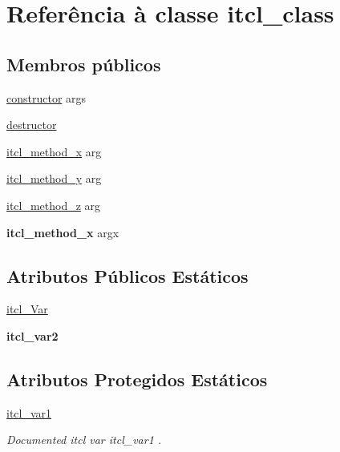 \hypertarget{classns_1_1itcl__class}{\section{Referência à classe itcl\-\_\-class}
\label{classns_1_1itcl__class}
}
\subsection*{Membros públicos}
\begin{DoxyCompactItemize}
\item 
\hyperlink{classns_1_1itcl__class_a774a51943bf6609f7582ee38c55a13f0}{constructor} args
\item 
\hyperlink{classns_1_1itcl__class_aa04747d49a3a74e75fcfdaf017a73877}{destructor}
\item 
\hyperlink{classns_1_1itcl__class_ac6935d07ea2c4734cdc930c839ee8c8b}{itcl\-\_\-method\-\_\-x} arg
\item 
\hyperlink{classns_1_1itcl__class_aebc048061815775e39d37da80986eaad}{itcl\-\_\-method\-\_\-y} arg
\item 
\hyperlink{classns_1_1itcl__class_a173dffcfe26dd79837a07bbdcf68b0ca}{itcl\-\_\-method\-\_\-z} arg
\item 
\hypertarget{classns_1_1itcl__class_af59b0413efa3edddf396f90765a7dbb0}{{\bfseries itcl\-\_\-method\-\_\-x} argx}\label{classns_1_1itcl__class_af59b0413efa3edddf396f90765a7dbb0}

\end{DoxyCompactItemize}
\subsection*{Atributos Públicos Estáticos}
\begin{DoxyCompactItemize}
\item 
\hyperlink{classns_1_1itcl__class_ad36615943b6e0b072f672602111414e7}{itcl\-\_\-\-Var}
\item 
\hypertarget{classns_1_1itcl__class_abef47039b3eb290a7ee36c12a800fd6e}{{\bfseries itcl\-\_\-var2}}\label{classns_1_1itcl__class_abef47039b3eb290a7ee36c12a800fd6e}

\end{DoxyCompactItemize}
\subsection*{Atributos Protegidos Estáticos}
\begin{DoxyCompactItemize}
\item 
\hypertarget{classns_1_1itcl__class_a1cf74cf501971e5432041e21fd6968a3}{\hyperlink{classns_1_1itcl__class_a1cf74cf501971e5432041e21fd6968a3}{itcl\-\_\-var1}}\label{classns_1_1itcl__class_a1cf74cf501971e5432041e21fd6968a3}

\begin{DoxyCompactList}\small\item\em Documented itcl var {\ttfamily itcl\-\_\-var1} . \end{DoxyCompactList}\end{DoxyCompactItemize}


